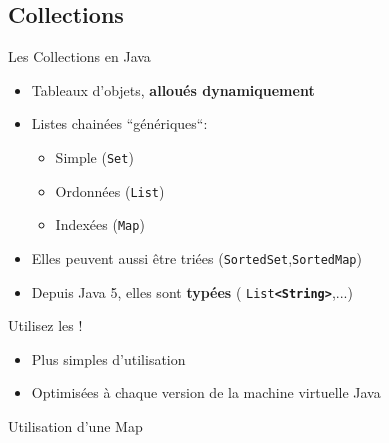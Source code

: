 \documentclass[handout]{beamer}
\begin{document}
\subsection{Collections}
\begin{frame}
	\begin{block}{Les Collections en Java}
	
		\begin{itemize}
			\item Tableaux d'objets, \textbf{alloués dynamiquement}
			\item Listes chainées ``génériques``:
			\begin{itemize}
				\item Simple (\texttt{Set})
				\item Ordonnées (\texttt{List})
				\item Indexées (\texttt{Map}) 
			\end{itemize}
			\item Elles peuvent aussi être triées (\texttt{SortedSet},\texttt{SortedMap})
			\item Depuis Java 5, elles sont \textbf{typées} ( \texttt{List\textbf{<String>}},...)
		\end{itemize}
	\end{block}
	\begin{block}{Utilisez les !}
	 	\begin{itemize}
	 		\item Plus simples d'utilisation
			\item Optimisées à chaque version de la machine virtuelle Java
	 	\end{itemize}
	\end{block}
\end{frame}
% 		

\begin{frame}
	\begin{block}{Utilisation d'une Map}
		
	\end{block}
\end{frame}
\end{document}
